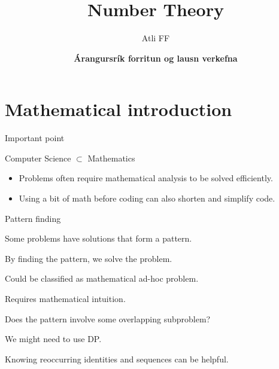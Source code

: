 \documentclass{beamer}
\title{Number Theory}
\author{Atli FF}
\institute{\href{http://ru.is/td}{School of Computer Science} \\[2pt] \href{http://ru.is}{Reykjavík University}}
\date{\textbf{Árangursrík forritun og lausn verkefna}}
\begin{document}
\begin{frame}[plain]
    \titlepage
\end{frame}

\section*{Mathematical introduction}

\begin{frame}[plain]{Important point}
    \begin{center}
        Computer Science $\subset$ Mathematics
    \end{center}
    \vspace{10pt}
    \begin{itemize}
        \item Problems often require mathematical analysis to be solved efficiently.
        \item Using a bit of math before coding can also shorten and simplify code.
    \end{itemize}
\end{frame}

\begin{frame}[plain]{Pattern finding}
    \vspace{20pt}
    \begin{itemize}
        \item Some problems have solutions that form a pattern.
         \item By finding the pattern, we solve the problem.
        \item Could be classified as mathematical ad-hoc problem.
        \item Requires mathematical intuition.
          {
            \item Does the pattern involve some overlapping subproblem? \\
        }  {
            We might need to use {\color{blue}DP}.
        }  {
            \item Knowing reoccurring identities and sequences can be helpful.
        }
    \end{itemize}
\end{frame}
\end{document}
